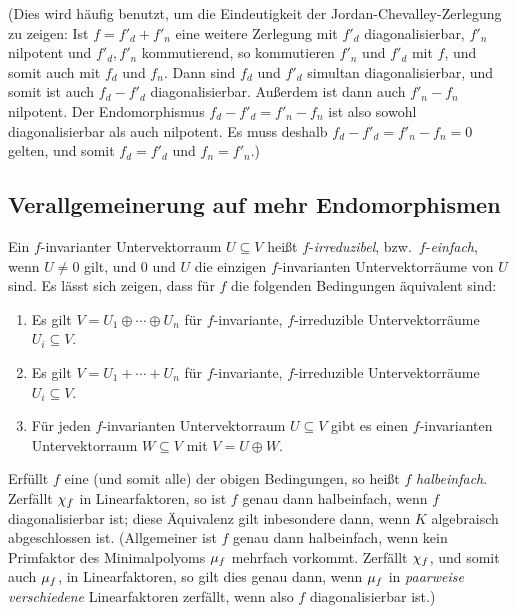 (Dies wird häufig benutzt, um die Eindeutigkeit der Jordan-Chevalley-Zerlegung zu zeigen:
Ist $f = f'_d + f'_n$ eine weitere Zerlegung mit $f'_d$ diagonalisierbar, $f'_n$ nilpotent und $f'_d, f'_n$ kommutierend, so kommutieren $f'_n$ und $f'_d$ mit $f$, und somit auch mit $f_d$ und $f_n$.
Dann sind $f_d$ und $f'_d$ simultan diagonalisierbar, und somit ist auch $f_d - f'_d$ diagonalisierbar.
Außerdem ist dann auch $f'_n - f_n$ nilpotent.
Der Endomorphismus $f_d - f'_d = f'_n - f_n$ ist also sowohl diagonalisierbar als auch nilpotent.
Es muss deshalb $f_d - f'_d = f'_n - f_n = 0$ gelten, und somit $f_d = f'_d$ und $f_n = f'_n$.)



\subsection*{Verallgemeinerung auf mehr Endomorphismen}

Ein $f$-invarianter Untervektorraum $U \subseteq V$ heißt $f$-\emph{irreduzibel}, bzw.\ $f$-\emph{einfach}, wenn $U \neq 0$ gilt, und $0$ und $U$ die einzigen $f$-invarianten Untervektorräume von $U$ sind.
Es lässt sich zeigen, dass für $f$ die folgenden Bedingungen äquivalent sind:

\begin{enumerate}
  \item
    Es gilt $V = U_1 \oplus \dotsb \oplus U_n$ für $f$-invariante, $f$-irreduzible Untervektorräume $U_i \subseteq V$.
  \item
    Es gilt $V = U_1 + \dotsb + U_n$ für $f$-invariante, $f$-irreduzible Untervektorräume $U_i \subseteq V$.
  \item
    Für jeden $f$-invarianten Untervektorraum $U \subseteq V$ gibt es einen $f$-invarianten Untervektorraum $W \subseteq V$ mit $V = U \oplus W$.
\end{enumerate}

Erfüllt $f$ eine (und somit alle) der obigen Bedingungen, so heißt $f$ \emph{halbeinfach}.
Zerfällt $\chi_{f}$ in Linearfaktoren, so ist $f$ genau dann halbeinfach, wenn $f$ diagonalisierbar ist;
diese Äquivalenz gilt inbesondere dann, wenn $K$ algebraisch abgeschlossen ist.
(Allgemeiner ist $f$ genau dann halbeinfach, wenn kein Primfaktor des Minimalpolyoms $\mu_{f}$ mehrfach vorkommt.
Zerfällt $\chi_{f}$, und somit auch $\mu_{f}$, in Linearfaktoren, so gilt dies genau dann, wenn $\mu_{f}$ in \emph{paarweise verschiedene} Linearfaktoren zerfällt, wenn also $f$ diagonalisierbar ist.)

